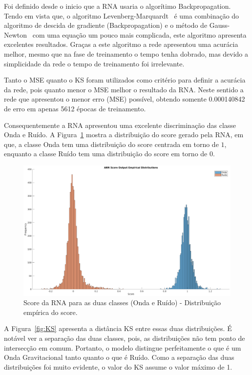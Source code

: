 Foi definido desde o inicio que a RNA usaria o algorítimo Backpropagation. Tendo em vista que, o algoritmo Levenberg-Marquardt~\cite{levenberg1944method} é uma combinação do algoritmo de descida de gradiente (Backpropagation) e o método de Gauss-Newton~\cite{bjorck1996numerical} com uma equação um pouco mais complicada, este algoritmo apresenta excelentes resultados. Graças a este algoritmo a rede apresentou uma acurácia melhor, mesmo que na fase de treinamento o tempo tenha dobrado, mas devido a simplicidade da rede o tempo de treinamento foi irrelevante.

Tanto o MSE quanto o KS foram utilizados como critério para definir a acurácia da rede, pois quanto menor o MSE melhor o resultado da RNA. Neste sentido a rede que apresentou o menor erro (MSE) possível, obtendo somente 0.000140842 de erro em apenas 5612 épocas de treinamento.

Consequentemente a RNA apresentou uma excelente discriminação das classe Onda e Ruído. A Figura~\ref{fig:histograma} mostra a distribuição do score gerado pela RNA, em que, a classe Onda tem uma distribuição do score centrada em torno de $1$, enquanto a classe Ruído tem uma distribuição do score em torno de $0$. 

\begin{figure}[H]
\centering
\includegraphics[width=1\textwidth]{figuras/histograma.eps}
\caption{Score da RNA para as duas classes (Onda e Ruído) - Distribuição empírica do score.}
\label{fig:histograma}
\end{figure}

A Figura~\ref{fig:KS} apresenta a distância KS entre essas duas distribuições. É notável ver a separação das duas classes, pois, as distribuições não tem ponto de intersecção em comum. Portanto, o modelo distingue perfeitamente o que é um Onda Gravitacional tanto quanto o que é Ruído. Como a separação das duas distribuições foi muito evidente, o valor do KS assume o valor máximo de 1.

